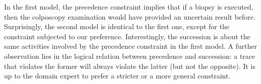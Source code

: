 In the first model, the \textsf{precedence} constraint implies that if a biopsy is executed, then the colposcopy examination would have provided an uncertain result before. Surprisingly, the second model is identical to the first one, except for the constraint subjected to our preference. Interestingly, the \textsf{succession} is about the same activities involved by the \textsf{precedence} constraint in the first model. A further observation lies in the logical relation between \textsf{precedence} and \textsf{succession}: a trace that violates the former will always violate the latter (but not the opposite). It is up to the domain expert to prefer a stricter or a more general constraint.



